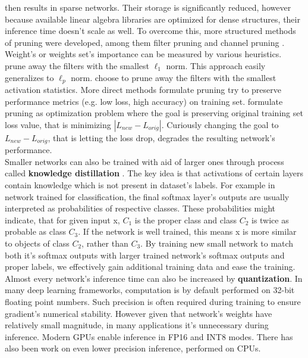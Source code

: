 \documentclass[../Main.tex]{subfiles}
\begin{document}
    then results in sparse networks. Their storage is significantly reduced, however
    because available linear algebra libraries are optimized for dense structures,
    their inference time doesn't scale as well. To overcome this, more structured
    methods of pruning were developed, among them filter pruning \cite{li2016pruning, molchanov2016pruning}
    and channel pruning \cite{he2017channel}. 
    Weight's or weights set's importance can be measured by various heuristics. 
    \cite{li2016pruning} prune away the filters with the smallest $\ell_1$ norm.
    This approach easily generalizes to $\ell_p$ norm.
    \cite{polyak2015} choose to prune away the filters with
    the smallest activation statistics. More direct methods formulate pruning 
    try to preserve performance metrics (e.g. low loss, high accuracy) on training set. 
    \cite{molchanov2016pruning} formulate pruning as optimization problem where
    the goal is preserving original training set loss value, that is minimizing
    $|L_{new} - L_{orig}|$. Curiously changing the goal to $L_{new} - L_{orig}$,
    that is letting the loss drop, degrades the resulting network's performance.\\
    Smaller networks can also be trained with aid of larger ones through process called
    \textbf{knowledge distillation} \cite{hinton2015distilling}. 
    The key idea is that activations of certain layers
    contain knowledge which is not present in dataset's labels. For example in network 
    trained for classification, the final softmax layer's outputs are usually 
    interpreted as probabilities of respective classes. These probabilities might indicate,
    that for given input x, $C_1$ is the proper class and class $C_2$ is twice as probable 
    as class $C_3$. If the network is well trained, this means x is more similar to
    objects of class $C_2$, rather than $C_3$. By training new small network to match both
    it's softmax outputs with larger trained network's softmax outputs and proper labels,
    we effectively gain additional training data and ease the training.
    Almost every network's inference time can also be increased by \textbf{quantization}.
    In many deep learning frameworks, computation is by default performed on
    32-bit floating point numbers. Such precision is often required during training to 
    ensure gradient's numerical stability. However given that network's weights have
    relatively small magnitude, in many applications it's unnecessary during inference.
    Modern GPUs enable inference in FP16 and INT8 modes. There has also been work 
    on even lower precision inference, performed on CPUs. 
    
        
\biblio %
\end{document}
